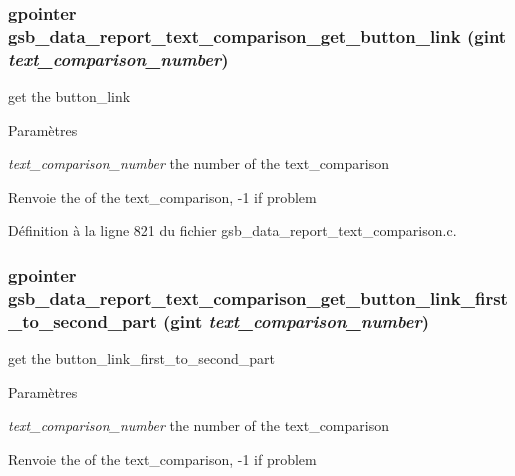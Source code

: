 \subsubsection[{gsb\_\-data\_\-report\_\-text\_\-comparison\_\-get\_\-button\_\-link}]{\setlength{\rightskip}{0pt plus 5cm}gpointer gsb\_\-data\_\-report\_\-text\_\-comparison\_\-get\_\-button\_\-link (gint {\em text\_\-comparison\_\-number})}\label{gsb__data__report__text__comparison_8h_a55a45156d527aca803836805f7adbff5}
get the button\_\-link


\begin{DoxyParams}{Paramètres}
\item[{\em text\_\-comparison\_\-number}]the number of the text\_\-comparison\end{DoxyParams}
\begin{DoxyReturn}{Renvoie}
the of the text\_\-comparison, -\/1 if problem 
\end{DoxyReturn}


Définition à la ligne 821 du fichier gsb\_\-data\_\-report\_\-text\_\-comparison.c.

\subsubsection[{gsb\_\-data\_\-report\_\-text\_\-comparison\_\-get\_\-button\_\-link\_\-first\_\-to\_\-second\_\-part}]{\setlength{\rightskip}{0pt plus 5cm}gpointer gsb\_\-data\_\-report\_\-text\_\-comparison\_\-get\_\-button\_\-link\_\-first\_\-to\_\-second\_\-part (gint {\em text\_\-comparison\_\-number})}\label{gsb__data__report__text__comparison_8h_ae935aa748f908f852a8cf7e17c4c8c80}
get the button\_\-link\_\-first\_\-to\_\-second\_\-part


\begin{DoxyParams}{Paramètres}
\item[{\em text\_\-comparison\_\-number}]the number of the text\_\-comparison\end{DoxyParams}
\begin{DoxyReturn}{Renvoie}
the of the text\_\-comparison, -\/1 if problem 
\end{DoxyReturn}


